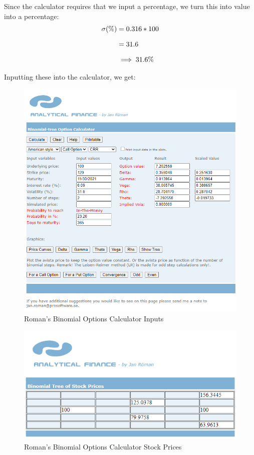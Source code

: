 \documentclass[12pt, letterpaper]{article}\usepackage{float}
\begin{document}
Since the calculator requires that we input a percentage, we turn this into value into a percentage:
\begin{equation*}
  \setlength{\jot}{10pt}
  \begin{split}
    \sigma (\%)
    & = 0.316 * 100
    \\
    & = 31.6
    \\
    & \implies 31.6\%
  \end{split}
\end{equation*}


Inputting these into the calculator, we get:
\begin{figure}[H]
  \includegraphics[scale=0.8]{Roman_binomial_calculator_inputs}
  \caption{Roman's Binomial Options Calculator Inputs}
\end{figure}

\begin{figure}[H]
  \includegraphics{Roman_binomial_calculator_stock_prices}
  \caption{Roman's Binomial Options Calculator Stock Prices}
\end{figure}
\end{document}
